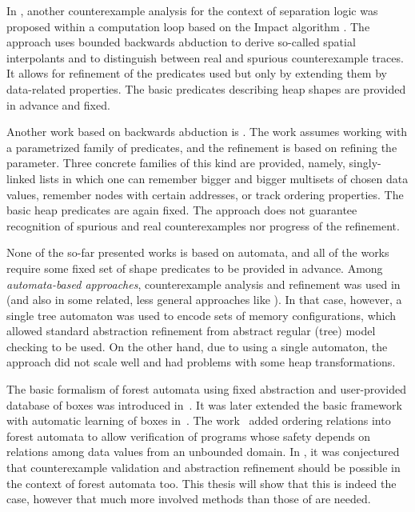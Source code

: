 	  In \cite{splinter15}, another counterexample analysis for the
	  context of separation logic was proposed within a computation loop based on the
	  Impact algorithm \cite{impact06}. The approach uses bounded backwards abduction
	  to derive so-called spatial interpolants and to distinguish between real and
	  spurious counterexample traces. It allows for refinement of the predicates used
	  but only by extending them by data-related properties. The basic predicates
	  describing heap shapes are provided in advance and fixed.
	  
	  Another work based on backwards abduction is \cite{botincan15}. The work assumes working with a
	  parametrized family of predicates, and the refinement is based on refining the
	  parameter. Three concrete families of this kind are provided, namely,
	  singly-linked lists in which one can remember bigger and bigger multisets of
	  chosen data values, remember nodes with certain addresses, or track ordering
	  properties. The basic heap predicates are again fixed. The approach does not
	  guarantee recognition of spurious and real counterexamples nor progress of the
	  refinement.

          None of the so-far presented works is based on automata,
          and all of the works require some fixed set of shape predicates to be provided
          in advance. Among \emph{automata-based approaches}, counterexample analysis and
          refinement was used in \cite{bhrv06b} (and also in some related, less general
          approaches like \cite{bhmv05}). In that case, however, a single tree automaton
          was used to encode sets of memory configurations, which allowed standard
          abstraction refinement from abstract regular (tree) model checking
          \cite{artmc} to be used. On the other hand, due to using a single automaton,
          the approach did not scale well and had problems with some heap transformations.

          The basic formalism of forest automata using fixed abstraction and
          user-provided database of boxes was introduced in~\cite{forester12}.
          It was later extended the basic framework with automatic learning of boxes
          in~\cite{boxes13}.
          The work~\cite{forester-data-acta} added ordering relations into forest
          automata to allow verification of
          programs whose safety depends on relations among data values
          from an unbounded domain.
          In \cite{forester12,boxes13}, it was conjectured that counterexample validation and
          abstraction refinement should be possible in the context of forest
          automata too. This thesis will show that this is indeed the case, however that much
          more involved methods than those of \cite{artmc} are needed.

